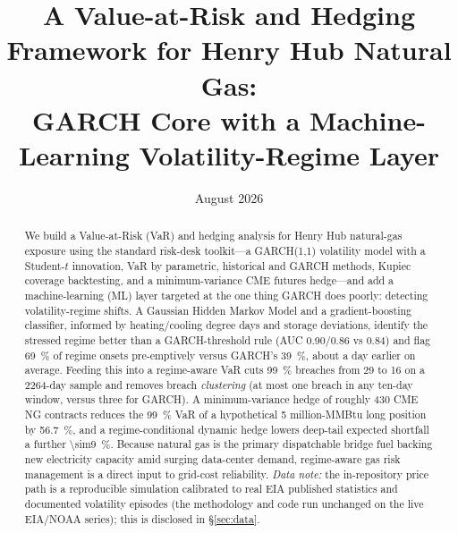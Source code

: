 \documentclass[11pt]{article}
\title{\bfseries A Value-at-Risk and Hedging Framework for Henry Hub Natural Gas:\\
GARCH Core with a Machine-Learning Volatility-Regime Layer}
\author{}\date{August 2026}
\begin{document}
\maketitle\vspace{-2.5em}

\begin{abstract}\noindent
We build a Value-at-Risk (VaR) and hedging analysis for Henry Hub natural-gas
exposure using the standard risk-desk toolkit---a GARCH(1,1) volatility model with
a Student-$t$ innovation, VaR by parametric, historical and GARCH methods, Kupiec
coverage backtesting, and a minimum-variance CME futures hedge---and add a
machine-learning (ML) layer targeted at the one thing GARCH does poorly: detecting
volatility-regime shifts. A Gaussian Hidden Markov Model and a gradient-boosting
classifier, informed by heating/cooling degree days and storage deviations,
identify the stressed regime better than a GARCH-threshold rule (AUC
\num{0.90}/\num{0.86} vs \num{0.84}) and flag \SI{69}{\percent} of regime onsets
pre-emptively versus GARCH's \SI{39}{\percent}, about a day earlier on average.
Feeding this into a regime-aware VaR cuts \SI{99}{\percent} breaches from 29 to 16
on a \num{2264}-day sample and removes breach \emph{clustering} (at most one breach
in any ten-day window, versus three for GARCH). A minimum-variance hedge of roughly
\num{430} CME NG contracts reduces the \SI{99}{\percent} VaR of a hypothetical
\SI{5}{} million-MMBtu long position by \SI{56.7}{\percent}, and a
regime-conditional dynamic hedge lowers deep-tail expected shortfall a further
\SI{\sim9}{\percent}. Because natural gas is the primary dispatchable bridge fuel
backing new electricity capacity amid surging data-center demand, regime-aware gas
risk management is a direct input to grid-cost reliability. \emph{Data note:} the
in-repository price path is a reproducible simulation calibrated to real EIA
published statistics and documented volatility episodes (the methodology and code
run unchanged on the live EIA/NOAA series); this is disclosed in \S\ref{sec:data}.
\end{abstract}
\end{document}
